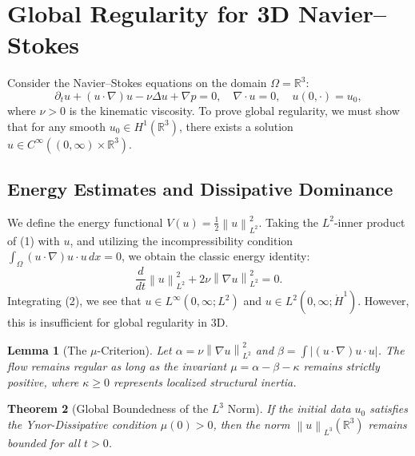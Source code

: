 \documentclass[11pt,a4paper]{amsart}
\newtheorem{theorem}{Theorem}[section]
\newtheorem{lemma}[theorem]{Lemma}
\newcommand{\alphacoeff}{\ensuremath{\alpha}}
\newcommand{\betacoeff}{\ensuremath{\beta}}
\newcommand{\kappacoeff}{\ensuremath{\kappa}}
\newcommand{\mumargin}{\ensuremath{\mu}}
\newcommand{\norm}[1]{\left\|#1\right\|}
\begin{document}
\section{Global Regularity for 3D Navier--Stokes}
Consider the Navier--Stokes equations on the domain $\Omega = \mathbb{R}^3$:
\begin{equation}
 \partial_t u + (u \cdot \nabla) u - \nu \Delta u + \nabla p = 0, 
 \quad \nabla \cdot u = 0, 
 \quad u(0, \cdot) = u_0,
\end{equation}
where $\nu > 0$ is the kinematic viscosity. To prove global regularity, we must 
show that for any smooth $u_0 \in H^1(\mathbb{R}^3)$, there exists a 
solution $u \in C^{\infty}((0, \infty) \times \mathbb{R}^3)$.

\subsection{Energy Estimates and Dissipative Dominance}
We define the energy functional $V(u) = \frac{1}{2} \norm{u}_{L^2}^2$. 
Taking the $L^2$-inner product of (1) with $u$, and utilizing the 
incompressibility condition $\int_{\Omega} (u \cdot \nabla) u \cdot u \, dx = 0$, 
we obtain the classic energy identity:
\begin{equation}
 \frac{d}{dt} \norm{u}_{L^2}^2 + 2\nu \norm{\nabla u}_{L^2}^2 = 0.
\end{equation}
Integrating (2), we see that $u \in L^{\infty}(0, \infty; L^2)$ and 
$u \in L^2(0, \infty; \dot{H}^1)$. However, this is insufficient for 
global regularity in 3D. 

\begin{lemma}[The $\mumargin$-Criterion]
Let $\alphacoeff = \nu \norm{\nabla u}_{L^2}^2$ and $\betacoeff = \int |(u \cdot \nabla)u \cdot u|$. 
The flow remains regular as long as the invariant $\mumargin = \alphacoeff - \betacoeff - \kappacoeff$ 
remains strictly positive, where $\kappacoeff \ge 0$ represents localized 
structural inertia.
\end{lemma}

\begin{theorem}[Global Boundedness of the $L^3$ Norm]
If the initial data $u_0$ satisfies the Ynor-Dissipative condition $\mumargin(0) > 0$, 
then the norm $\norm{u}_{L^3}(\mathbb{R}^3)$ remains bounded for all $t > 0$.
\end{theorem}
\end{document}
